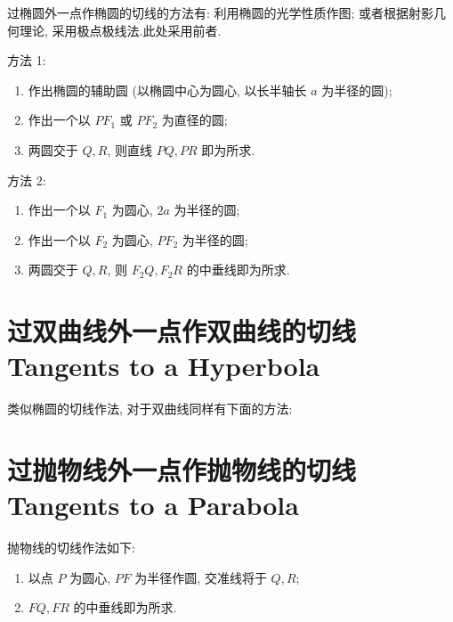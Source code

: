 过椭圆外一点作椭圆的切线的方法有: 利用椭圆的光学性质作图; 
或者根据射影几何理论, 采用极点极线法.此处采用前者.

方法 1: 

\begin{enumerate}
  \item 作出椭圆的辅助圆 (以椭圆中心为圆心, 以长半轴长 $a$ 为半径的圆);
  \item 作出一个以 $PF_1$ 或 $PF_2$ 为直径的圆;
  \item 两圆交于 $Q,R$, 则直线 $PQ,PR$ 即为所求.
\end{enumerate}


方法 2: 

\begin{enumerate}
  \item 作出一个以 $F_1$ 为圆心, $2a$ 为半径的圆;
  \item 作出一个以 $F_2$ 为圆心, $PF_2$ 为半径的圆;
  \item 两圆交于 $Q,R$, 则 $F_2Q,F_2R$ 的中垂线即为所求.
\end{enumerate}


\section{过双曲线外一点作双曲线的切线 Tangents to a Hyperbola}

类似椭圆的切线作法, 对于双曲线同样有下面的方法:



\section{过抛物线外一点作抛物线的切线 Tangents to a Parabola}

抛物线的切线作法如下:

\begin{enumerate}
  \item 以点 $P$ 为圆心, $PF$ 为半径作圆, 交准线将于 $Q,R$;
  \item $FQ,FR$ 的中垂线即为所求.
\end{enumerate}

